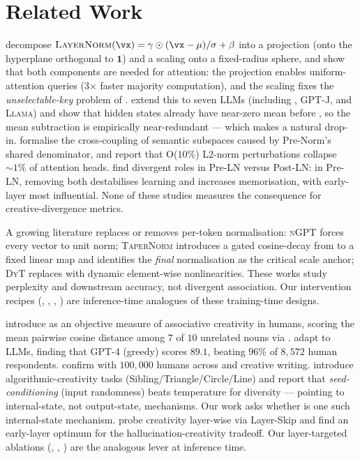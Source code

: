 \section{Related Work}
\label{sec:related}

\citet{brody2023expressivity} decompose
$\layernorm(\vx)=\gamma\odot(\vx-\mu)/\sigma+\beta$ into a projection (onto
the hyperplane orthogonal to $\bm{1}$) and a scaling onto a fixed-radius
sphere, and show that both components are needed for attention: the
projection enables uniform-attention queries (3$\times$ faster majority
computation), and the scaling fixes the \emph{unselectable-key} problem of
\citet{demeter2020stolen}. \citet{gupta2024geometric} extend this to seven
LLMs (including \pythia, \textsc{GPT-J}, and \textsc{Llama}) and show that
hidden states already have near-zero mean before \layernorm, so the mean
subtraction is empirically near-redundant --- which makes \rmsnorm
\citep{zhang2019root} a natural drop-in. \citet{menary2024transformer}
formalise the cross-coupling of semantic subspaces caused by Pre-Norm's
shared denominator, and report that O($10\%$) L2-norm perturbations
collapse $\sim\!1\%$ of attention heads. \citet{singhal2025impact} find
divergent roles in Pre-LN versus Post-LN: in Pre-LN, removing \layernorm
both destabilises learning and increases memorisation, with early-layer
\layernorm most influential. None of these studies measures the consequence
for creative-divergence metrics.

A growing literature replaces or removes per-token normalisation:
\textsc{nGPT} \citep{loshchilov2025ngpt} forces every vector to unit norm;
\textsc{TaperNorm} \citep{kanavalau2026taper} introduces a gated
cosine-decay from \rmsnorm to a fixed linear map and identifies the
\emph{final} normalisation as the critical scale anchor; \textsc{DyT}
\citep{zhu2025dynamic} replaces \layernorm with dynamic element-wise
nonlinearities. These works study perplexity and downstream accuracy, not
divergent association. Our intervention recipes (\nomean, \noaffine,
\weakened, \identityln) are inference-time analogues of these training-time
designs.

\citet{olson2021naming} introduce \dat as an objective measure of
associative creativity in humans, scoring the mean pairwise cosine distance
among $7$ of $10$ unrelated nouns via \glove. \citet{chen2023probing}
adapt \dat to LLMs, finding that \textsc{GPT-4} (greedy) scores $89.1$,
beating $96\%$ of $8{,}572$ human respondents.
\citet{bellemare2024divergent} confirm with $100{,}000$ humans across \dat
and creative writing. \citet{nagarajan2025roll} introduce
algorithmic-creativity tasks (Sibling/Triangle/Circle/Line) and report that
\emph{seed-conditioning} (input randomness) beats temperature for diversity
--- pointing to internal-state, not output-state, mechanisms. Our work asks
whether \layernorm is one such internal-state mechanism. \citet{he2025shakespearean}
probe creativity layer-wise via Layer-Skip and find an early-layer optimum
for the hallucination-creativity tradeoff. Our layer-targeted ablations
(\tgtearly, \tgtmid, \tgtlate) are the analogous lever at inference time.

